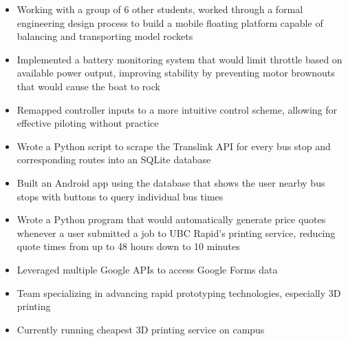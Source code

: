 \documentclass{resume}
\begin{document}
\begin{itemize}
	\item Working with a group of 6 other students, worked through a formal engineering design process to build a mobile floating platform capable of balancing and transporting model rockets
	\item Implemented a battery monitoring system that would limit throttle based on available power output, improving stability by preventing motor brownouts that would cause the boat to rock
	\item Remapped controller inputs to a more intuitive control scheme, allowing for effective piloting without practice
\end{itemize}

\begin{itemize}
	\item Wrote a Python script to scrape the Translink API for every bus stop and corresponding routes into an SQLite database
	\item Built an Android app using the database that shows the user nearby bus stops with buttons to query individual bus times
\end{itemize}

\begin{itemize}
	\item Wrote a Python program that would automatically generate price quotes whenever a user submitted a job to UBC Rapid's printing service, reducing quote times from up to 48 hours down to 10 minutes
	\item Leveraged multiple Google APIs to access Google Forms data
\end{itemize}

\StudentTeams

\begin{itemize}
	\item Team specializing in advancing rapid prototyping technologies, especially 3D printing
	\item Currently running cheapest 3D printing service on campus
\end{itemize}

\OtherWorkExperience
\end{document}
